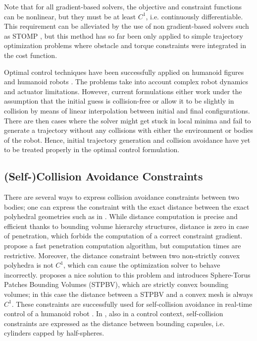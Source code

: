 Note that for all gradient-based solvers, the objective and constraint
functions can be nonlinear, but they must be at least $C^1$,
i.e. continuously differentiable. This requirement can be alleviated
by the use of non gradient-based solvers such as STOMP
\cite{Kalakrishnan2011}, but this method has so far been only applied
to simple trajectory optimization problems where obstacle and torque
constraints were integrated in the cost function.


Optimal control techniques have been successfully applied on humanoid
figures \cite{Schultz2010} and humanoid robots \cite{Toussaint2007,
  Lengagne2010}. The problems take into account complex robot dynamics
and actuator limitations. However, current formulations either work
under the assumption that the initial guess is collision-free or allow
it to be slightly in collision by means of linear interpolation
between initial and final configurations. There are then cases where
the solver might get stuck in local minima and fail to generate a
trajectory without any collisions with either the environment or
bodies of the robot. Hence, initial trajectory generation and
collision avoidance have yet to be treated properly in the optimal
control formulation.

\subsection{(Self-)Collision Avoidance Constraints}
There are several ways to express collision avoidance constraints
between two bodies; one can express the constraint with the exact
distance between the exact polyhedral geometries such as in
\cite{Larsen2000}. While distance computation is precise and efficient
thanks to bounding volume hierarchy structures, distance is zero in
case of penetration, which forbids the computation of a correct
constraint gradient. \cite{Kim2002} propose a fast penetration
computation algorithm, but computation times are
restrictive. Moreover, the distance constraint between two
non-strictly convex polyhedra is not $C^1$, which can cause the
optimization solver to behave incorrectly. \cite{Escande2007} proposes
a nice solution to this problem and introduces Sphere-Torus Patches
Bounding Volumes (STPBV), which are strictly convex bounding volumes;
in this case the distance between a STPBV and a convex mesh is always
$C^1$. These constraints are successfully used for self-collision
avoidance in real-time control of a humanoid robot
\cite{Stasse2008}. In \cite{Kanoun2011}, also in a control context,
self-collision constraints are expressed as the distance between
bounding capsules, i.e. cylinders capped by half-spheres.

